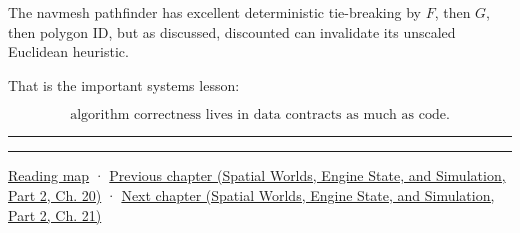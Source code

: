 The navmesh pathfinder has excellent deterministic tie-breaking by \(F\), then \(G\), then polygon ID, but as discussed, discounted  can invalidate its unscaled Euclidean heuristic.

That is the important systems lesson:

\[
\boxed{
\text{algorithm correctness lives in data contracts as much as code}.
}
\]

\begin{center}\rule{0.5\linewidth}{0.5pt}\end{center}

\begin{center}\rule{0.5\linewidth}{0.5pt}\end{center}

\hyperref[volume-reading-map]{Reading map} · \href{../05-Spatial-Worlds-Engine-State-and-Simulation-P02/main.pdf\#06-engine-ii-ch029-dynamic-spatial-indices-for-moving-worlds}{Previous chapter (Spatial Worlds, Engine State, and Simulation, Part 2, Ch. 20)} · \href{../05-Spatial-Worlds-Engine-State-and-Simulation-P02/main.pdf\#06-engine-ii-ch031-spatial-index-serialization-and-query-evidence}{Next chapter (Spatial Worlds, Engine State, and Simulation, Part 2, Ch. 21)}
